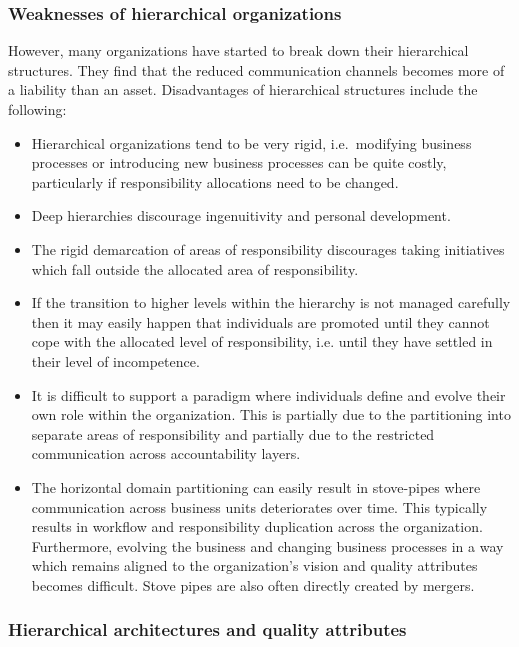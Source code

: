 \documentclass[11pt,english,a4]{article}
\begin{document}
\subsubsection{Weaknesses of hierarchical organizations}

However, many organizations have started to break down their hierarchical structures. They find that the reduced communication channels becomes more of a liability than an asset. Disadvantages of hierarchical structures include the following: 
\begin{itemize}
  \item Hierarchical organizations tend to be very rigid, i.e.\ modifying business processes or introducing new 
         business processes can be quite costly, particularly if responsibility allocations need to be changed.
  \item Deep hierarchies discourage ingenuitivity and personal development.
  \item The rigid demarcation of areas of responsibility discourages taking initiatives which fall outside the allocated area of responsibility.
  \item If the transition to higher levels within the hierarchy is not managed carefully then it may easily happen that individuals are promoted until they cannot cope with the allocated level of responsibility, i.e. until they have settled in their level of incompetence.
  \item It is difficult to support a paradigm where individuals define and evolve their own role within the organization. This is partially due to the partitioning into separate areas of responsibility and partially due to the restricted communication across accountability layers.
  \item The horizontal domain partitioning can easily result in stove-pipes where communication across business units deteriorates over time. This typically results in workflow and responsibility duplication across the organization. Furthermore, evolving the business and changing business processes in a way which remains aligned to the organization's vision and quality attributes becomes difficult. Stove pipes are also often directly created by mergers.
\end{itemize}

\subsubsection{Hierarchical architectures and quality attributes}
\end{document}
